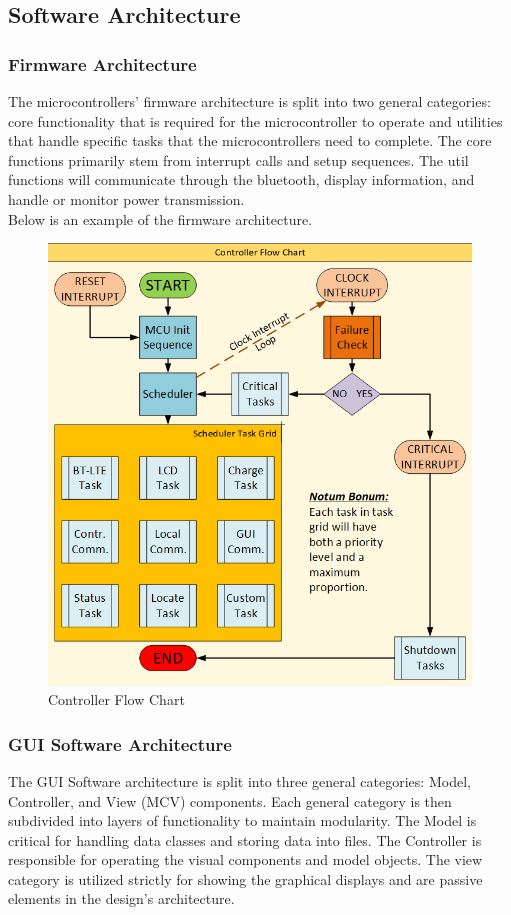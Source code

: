 \documentclass[12pt]{article}
\begin{document}
\hfill

\pagebreak

\subsection{Software Architecture}
\subsubsection{Firmware Architecture} The microcontrollers’ firmware architecture is split into two general categories: core functionality that is required for the microcontroller to operate and utilities that handle specific tasks that the microcontrollers need to complete.  The core functions primarily stem from interrupt calls and setup sequences.  The util functions will communicate through the bluetooth, display information, and handle or monitor power transmission.\\

\indent
Below is an example of the firmware architecture.
\hfill

\begin{figure}[h!]
\centering
\includegraphics[width=0.88\linewidth]{mcu_workflow}
\caption{Controller Flow Chart}
\end{figure}

\hfill

\subsubsection{GUI Software Architecture} The GUI Software architecture is split into three general categories: Model, Controller, and View (MCV) components.  Each general category is then subdivided into layers of functionality to maintain modularity.  The Model is critical for handling data classes and storing data into files.  The Controller is responsible for operating the visual components and model objects.  The view category is utilized strictly for showing the graphical displays and are passive elements in the design’s architecture.\\
\end{document}
